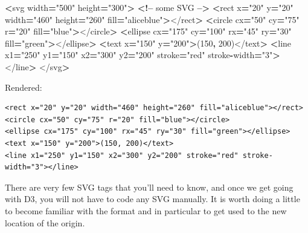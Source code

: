 \documentclass[]{book}
\newenvironment{Shaded}{\begin{snugshade}}{\end{snugshade}}
\newcommand{\DecValTok}[1]{\textcolor[rgb]{0.00,0.00,0.81}{#1}}
\newcommand{\NormalTok}[1]{#1}
\newcommand{\OperatorTok}[1]{\textcolor[rgb]{0.81,0.36,0.00}{\textbf{#1}}}
\newcommand{\StringTok}[1]{\textcolor[rgb]{0.31,0.60,0.02}{#1}}
\begin{document}
\begin{Shaded}
\begin{Highlighting}[]
\OperatorTok{<}\NormalTok{svg width}\OperatorTok{=}\StringTok{"500"}\NormalTok{ height}\OperatorTok{=}\StringTok{"300"}\OperatorTok{>}  \OperatorTok{<!--}\NormalTok{ some SVG }\OperatorTok{-->}
    \OperatorTok{<}\NormalTok{rect x}\OperatorTok{=}\StringTok{"20"}\NormalTok{ y}\OperatorTok{=}\StringTok{"20"}\NormalTok{ width}\OperatorTok{=}\StringTok{"460"}\NormalTok{ height}\OperatorTok{=}\StringTok{"260"}\NormalTok{ fill}\OperatorTok{=}\StringTok{"aliceblue"}\OperatorTok{>}\NormalTok{</rect}\OperatorTok{>}
    \OperatorTok{<}\NormalTok{circle cx}\OperatorTok{=}\StringTok{"50"}\NormalTok{ cy}\OperatorTok{=}\StringTok{"75"}\NormalTok{ r}\OperatorTok{=}\StringTok{"20"}\NormalTok{ fill}\OperatorTok{=}\StringTok{"blue"}\OperatorTok{>}\NormalTok{</circle}\OperatorTok{>}
    \OperatorTok{<}\NormalTok{ellipse cx}\OperatorTok{=}\StringTok{"175"}\NormalTok{ cy}\OperatorTok{=}\StringTok{"100"}\NormalTok{ rx}\OperatorTok{=}\StringTok{"45"}\NormalTok{ ry}\OperatorTok{=}\StringTok{"30"}\NormalTok{ fill}\OperatorTok{=}\StringTok{"green"}\OperatorTok{>}\NormalTok{</ellipse}\OperatorTok{>}
    \OperatorTok{<}\NormalTok{text x}\OperatorTok{=}\StringTok{"150"}\NormalTok{ y}\OperatorTok{=}\StringTok{"200"}\OperatorTok{>}\NormalTok{(}\DecValTok{150}\OperatorTok{,} \DecValTok{200}\NormalTok{)</text}\OperatorTok{>}
    \OperatorTok{<}\NormalTok{line x1}\OperatorTok{=}\StringTok{"250"}\NormalTok{ y1}\OperatorTok{=}\StringTok{"150"}\NormalTok{ x2}\OperatorTok{=}\StringTok{"300"}\NormalTok{ y2}\OperatorTok{=}\StringTok{"200"}\NormalTok{ stroke}\OperatorTok{=}\StringTok{"red"}\NormalTok{ stroke}\OperatorTok{-}\NormalTok{width}\OperatorTok{=}\StringTok{"3"}\OperatorTok{>}\NormalTok{</line}\OperatorTok{>}
\NormalTok{</svg}\OperatorTok{>}
\end{Highlighting}
\end{Shaded}

Rendered:

\begin{verbatim}
<rect x="20" y="20" width="460" height="260" fill="aliceblue"></rect>
<circle cx="50" cy="75" r="20" fill="blue"></circle>
<ellipse cx="175" cy="100" rx="45" ry="30" fill="green"></ellipse>
<text x="150" y="200">(150, 200)</text>
<line x1="250" y1="150" x2="300" y2="200" stroke="red" stroke-width="3"></line>
\end{verbatim}

There are very few SVG tags that you'll need to know, and once we get going with D3, you will not have to code any SVG manually. It is worth doing a little to become familiar with the format and in particular to get used to the new location of the origin.
\end{document}
